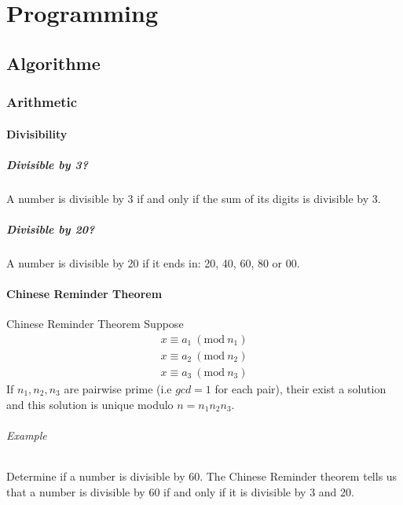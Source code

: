 \part{Programming}
\chapter{Algorithme}

\section{Arithmetic}

\subsection{Divisibility}
\subsubsection{Divisible by 3?}
A number is divisible by 3 if and only if the sum of its digits is divisible by 3.

\subsubsection{Divisible by 20?}
A number is divisible by 20 if it ends in: 20, 40, 60, 80 or 00.

\subsection{Chinese Reminder Theorem}

\theoremstyle{definition}
\begin{definition}{Chinese Reminder Theorem}
Suppose
\begin{equation}
    \begin{split}
        x \equiv a_1  \ (\textrm{mod}\ n_1) \\
        x \equiv a_2  \ (\textrm{mod}\ n_2) \\
        x \equiv a_3  \ (\textrm{mod}\ n_3)
    \end{split}
\end{equation}
If $n_1, n_2, n_3$ are pairwise prime (i.e $gcd = 1$ for each pair), their exist a solution and this solution is unique modulo $n = n_1 n_2 n_3$.
\end{definition}

\paragraph{Example}
Determine if a number is divisible by 60. The Chinese Reminder theorem tells us that a number is divisible by 60 if and only if it is divisible by 3 and 20.


